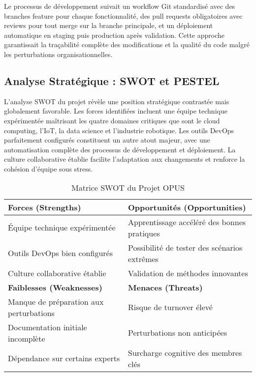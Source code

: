 \documentclass[12pt,a4paper]{article}
\begin{document}
Le processus de développement suivait un workflow Git standardisé avec des branches feature pour chaque fonctionnalité, des pull requests obligatoires avec reviews pour tout merge sur la branche principale, et un déploiement automatique en staging puis production après validation. Cette approche garantissait la traçabilité complète des modifications et la qualité du code malgré les perturbations organisationnelles.

\subsection{Analyse Stratégique : SWOT et PESTEL}

L'analyse SWOT du projet révèle une position stratégique contrastée mais globalement favorable. Les forces identifiées incluent une équipe technique expérimentée maîtrisant les quatre domaines critiques que sont le cloud computing, l'IoT, la data science et l'industrie robotique. Les outils DevOps parfaitement configurés constituent un autre atout majeur, avec une automatisation complète des processus de développement et déploiement. La culture collaborative établie facilite l'adaptation aux changements et renforce la cohésion d'équipe sous stress.

\begin{table}[H]
\centering
\caption{Matrice SWOT du Projet OPUS}
\begin{tabular}{|p{6cm}|p{6cm}|}
\hline
\rowcolor{green!20}
\textbf{Forces (Strengths)} & \textbf{Opportunités (Opportunities)} \\
\hline
Équipe technique expérimentée & Apprentissage accéléré des bonnes pratiques \\
Outils DevOps bien configurés & Possibilité de tester des scénarios extrêmes \\
Culture collaborative établie & Validation de méthodes innovantes \\
\hline
\rowcolor{red!20}
\textbf{Faiblesses (Weaknesses)} & \textbf{Menaces (Threats)} \\
\hline
Manque de préparation aux perturbations & Risque de turnover élevé \\
Documentation initiale incomplète & Perturbations non anticipées \\
Dépendance sur certains experts & Surcharge cognitive des membres clés \\
\hline
\end{tabular}
\end{table}
\end{document}
